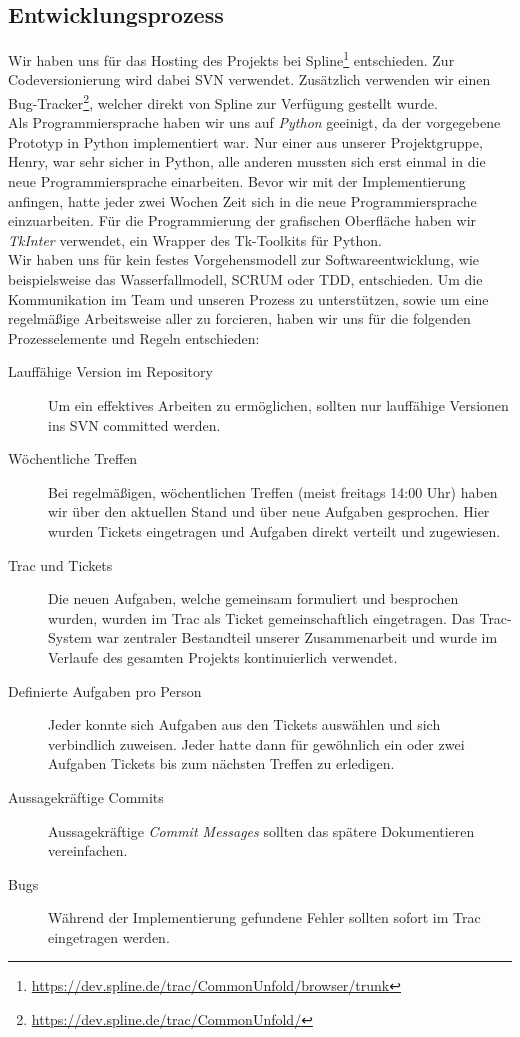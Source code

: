 \subsection{Entwicklungsprozess}
\label{subsec:prozess}

Wir haben uns für das Hosting des Projekts bei Spline\footnote{\url{https://dev.spline.de/trac/CommonUnfold/browser/trunk}} entschieden. Zur Codeversionierung wird dabei SVN verwendet. Zusätzlich verwenden wir einen Bug-Tracker\footnote{\url{https://dev.spline.de/trac/CommonUnfold/}}, welcher direkt von Spline zur Verfügung gestellt wurde.\\

Als Programmiersprache haben wir uns auf \emph{Python} geeinigt, da der vorgegebene Prototyp in Python implementiert war. Nur einer aus unserer Projektgruppe, Henry, war sehr sicher in Python, alle anderen mussten sich erst einmal in die neue Programmiersprache einarbeiten. Bevor wir mit der Implementierung anfingen, hatte jeder zwei Wochen Zeit sich in die neue Programmiersprache einzuarbeiten. Für die Programmierung der grafischen Oberfläche haben wir \emph{TkInter} verwendet, ein Wrapper des Tk-Toolkits für Python.\\

Wir haben uns für kein festes Vorgehensmodell zur Softwareentwicklung, wie beispielsweise das Wasserfallmodell, SCRUM oder TDD, entschieden. Um die Kommunikation im Team und unseren Prozess zu unterstützen, sowie um eine regelmäßige Arbeitsweise aller zu forcieren, haben wir uns für die folgenden Prozesselemente und Regeln entschieden:

  \begin{description}
    \item[Lauffähige Version im Repository] Um ein effektives Arbeiten zu ermöglichen, sollten nur lauffähige Versionen ins SVN committed werden.
    \item[Wöchentliche Treffen] Bei regelmäßigen, wöchentlichen Treffen (meist freitags 14:00 Uhr) haben wir über den aktuellen Stand und über neue Aufgaben gesprochen. Hier wurden Tickets eingetragen und Aufgaben direkt verteilt und zugewiesen.
    \item[Trac und Tickets] Die neuen Aufgaben, welche gemeinsam formuliert und besprochen wurden, wurden im Trac als Ticket gemeinschaftlich eingetragen. Das Trac-System war zentraler Bestandteil unserer Zusammenarbeit und wurde im Verlaufe des gesamten Projekts kontinuierlich verwendet.
    \item[Definierte Aufgaben pro Person] Jeder konnte sich Aufgaben aus den Tickets auswählen und sich verbindlich zuweisen. Jeder hatte dann für gewöhnlich ein oder zwei Aufgaben \bzw Tickets bis zum nächsten Treffen zu erledigen.
    \item[Aussagekräftige Commits] Aussagekräftige \emph{Commit Messages} sollten das spätere Dokumentieren vereinfachen.
    \item[Bugs] Während der Implementierung gefundene Fehler sollten sofort im Trac eingetragen werden. 
  \end{description}

